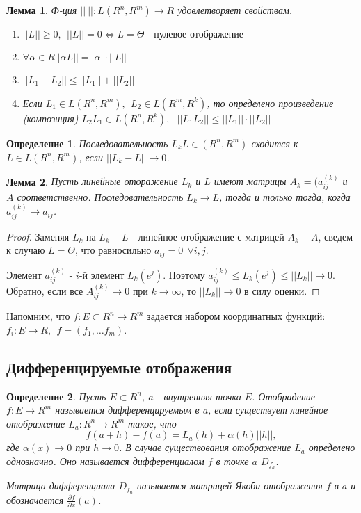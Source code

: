 \documentclass{article}
\newtheorem*{df}{Определение}
\newtheorem{lem}{Лемма}
\begin{document}
  \begin{lem} 
  Ф-ция $||~||: L(R^n, R^m) \rightarrow R $ удовлетворяет свойствам.
  \begin{enumerate}
  \item $||L||\geqslant 0 ,~~||L||= 0 \Leftrightarrow L = \Theta \text{ - нулевое отображение} $
  \item $ \forall \alpha \in R||\alpha L||= |\alpha| \cdot||L||$
  \item $||L_1 + L_2||\leqslant||L_1||+||L_2||$\
  \item Если $ L_1 \in L(R^n, R^m), ~~ L_2 \in L(R^m, R^k) $, то  определено произведение (композиция) $ L_2L_1 \in L(R^n, R^k), ~~~||L_1L_2||\leqslant||L_1||\cdot||L_2||$
  \end{enumerate}
  \end{lem}
  
  \begin{df} 
  Последовательность $L_k L \in (R^n, R^m)$ сходится к $L \in L(R^n, R^m)$, если $||L_k - L||\rightarrow 0 $.
  \end{df}
    
  \begin{lem} 
  Пусть линейные оторажение $L_k$ и $L$ имеют матрицы $ A_k = (a_{ij}^{(k)} $ и $A$ соответственно. Последовательность $L_k \rightarrow L$, тогда и только тогда, когда  $a_{ij}^{(k)} \rightarrow a_{ij} $.
  \end{lem}
  \begin{proof}  
  Заменяя $L_k$ на $L_k - L$ - линейное отображение с матрицей $A_k - A$, сведем к случаю $ L = \Theta $, что равносильно $ a_{ij} = 0 ~~ \forall i, j $. 
  
  Элемент $a_{ij}^{(k)} $ - $i$-й элемент $ L_k(e^j) $. Поэтому $ a_{ij}^{(k)} \leqslant L_k(e^j) \leqslant||L_k||\rightarrow 0 $. Обратно, если все $A_{ij}^{(k)} \rightarrow 0$ при $k \rightarrow \infty $, то $||L_k||\rightarrow 0 $ в силу оценки.
  \end{proof}
  
  Напомним, что $f: E \subset R^n \rightarrow R^m$ задается набором координатных функций: $f_i : E \rightarrow R,~~ f = (f_1,\ldots f_m) $.
  
  \subsection*{Дифференцируемые отображения}
  \begin{df} 
  Пусть $E \subset R^n$, $a$ - внутренняя точка $E$. Отобрадение $f: E \rightarrow R^m $ называется дифференцируемым в $a$, если существует линейное отображение $L_a : R^n \rightarrow R^m $ такое, что 
  \begin{equation}
  \label{diff}
  f(a + h) - f(a) = L_a(h) + \alpha(h)||h||,
  \end{equation}
где $\alpha (x) \rightarrow 0 $ при $h \rightarrow 0$.  
В случае существования отображение $L_a$ определено однозначно.  Оно называется дифференциалом $f$ в точке $a$ $D_{f_a} $.

Матрица дифференциала $D_{f_a} $ называется матрицей Якоби отображения $f$ в $a$ и обозначается $ \frac{\partial f}{\partial x}(a) $.
  \end{df}
\end{document}
